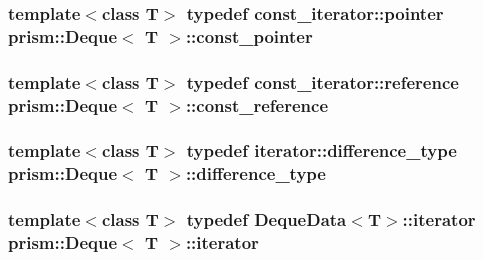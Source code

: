 \subsubsection[{\texorpdfstring{const\+\_\+pointer}{const_pointer}}]{\setlength{\rightskip}{0pt plus 5cm}template$<$class T$>$ typedef const\+\_\+iterator\+::pointer {\bf prism\+::\+Deque}$<$ T $>$\+::{\bf const\+\_\+pointer}}\hypertarget{classprism_1_1_deque_a4c43189271514578fda69c968b1d4e3c}{}\label{classprism_1_1_deque_a4c43189271514578fda69c968b1d4e3c}
\subsubsection[{\texorpdfstring{const\+\_\+reference}{const_reference}}]{\setlength{\rightskip}{0pt plus 5cm}template$<$class T$>$ typedef const\+\_\+iterator\+::reference {\bf prism\+::\+Deque}$<$ T $>$\+::{\bf const\+\_\+reference}}\hypertarget{classprism_1_1_deque_a8fcabfe6976606b91b4abef0e0353584}{}\label{classprism_1_1_deque_a8fcabfe6976606b91b4abef0e0353584}
\subsubsection[{\texorpdfstring{difference\+\_\+type}{difference_type}}]{\setlength{\rightskip}{0pt plus 5cm}template$<$class T$>$ typedef iterator\+::difference\+\_\+type {\bf prism\+::\+Deque}$<$ T $>$\+::{\bf difference\+\_\+type}}\hypertarget{classprism_1_1_deque_a2639a05f15b2d1748258ceb9f6e5c8c3}{}\label{classprism_1_1_deque_a2639a05f15b2d1748258ceb9f6e5c8c3}
\subsubsection[{\texorpdfstring{iterator}{iterator}}]{\setlength{\rightskip}{0pt plus 5cm}template$<$class T$>$ typedef Deque\+Data$<$T$>$\+::{\bf iterator} {\bf prism\+::\+Deque}$<$ T $>$\+::{\bf iterator}}\hypertarget{classprism_1_1_deque_af6fbdfa6e826f7f71b29f4d3cfb72ed1}{}\label{classprism_1_1_deque_af6fbdfa6e826f7f71b29f4d3cfb72ed1}
